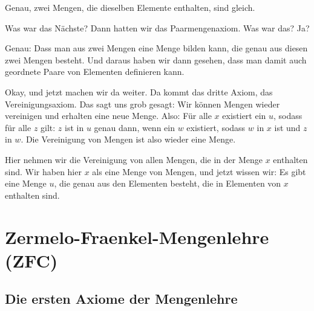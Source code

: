 \begin{spoken-clean}[continued]
Genau, zwei Mengen, die dieselben Elemente enthalten, sind gleich.
\end{spoken-clean}

\begin{spoken-clean}[00:12:15 - 00:15:06]
Was war das Nächste? Dann hatten wir das Paarmengenaxiom. Was war das? Ja?

Genau: Dass man aus zwei Mengen eine Menge bilden kann, die genau aus diesen zwei Mengen besteht. Und daraus haben wir dann gesehen, dass man damit auch geordnete Paare von Elementen definieren kann.

Okay, und jetzt machen wir da weiter. Da kommt das dritte Axiom, das Vereinigungsaxiom. Das sagt uns grob gesagt: Wir können Mengen wieder vereinigen und erhalten eine neue Menge. Also: Für alle $x$ existiert ein $u$, sodass für alle $z$ gilt: $z$ ist in $u$ genau dann, wenn ein $w$ existiert, sodass $w$ in $x$ ist und $z$ in $w$. Die Vereinigung von Mengen ist also wieder eine Menge.

Hier nehmen wir die Vereinigung von allen Mengen, die in der Menge $x$ enthalten sind. Wir haben hier $x$ als eine Menge von Mengen, und jetzt wissen wir: Es gibt eine Menge $u$, die genau aus den Elementen besteht, die in Elementen von $x$ enthalten sind.
\end{spoken-clean}

\section{Zermelo-Fraenkel-Mengenlehre (ZFC)}

\subsection{Die ersten Axiome der Mengenlehre}

